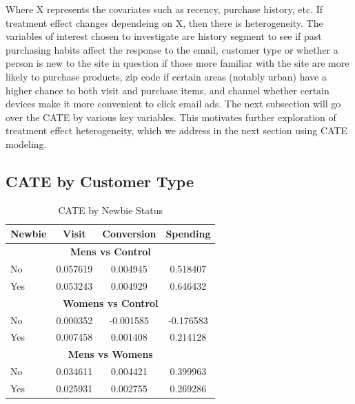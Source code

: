 \documentclass[10pt]{article}
\begin{document}
Where X represents the covariates such as recency, purchase history, etc. If treatment effect changes dependeing on X, then there is heterogeneity. The variables of interest chosen to investigate are history segment to see if past purchasing habits affect the response to the email, customer type or whether a person is new to the site in question if those more familiar with the site are more likely to purchase products, zip code if certain areas (notably urban) have a higher chance to both visit and purchase items, and channel whether certain devices make it more convenient to click email ads. The next subsection will go over the CATE by various key variables. This motivates further exploration of treatment effect heterogeneity, which we address in the next section using CATE modeling.


\subsection{CATE by Customer Type}

\begin{table}[H]
\centering
\caption{CATE by Newbie Status}
\begin{tabular}{lccc}
\toprule
\textbf{Newbie} & \textbf{Visit} & \textbf{Conversion} & \textbf{Spending} \\
\midrule
\multicolumn{4}{c}{\textbf{Mens vs Control}} \\
\midrule
No  & 0.057619 & 0.004945 & 0.518407 \\
Yes & 0.053243 & 0.004929 & 0.646432 \\
\midrule
\multicolumn{4}{c}{\textbf{Womens vs Control}} \\
\midrule
No  & 0.000352 & -0.001585 & -0.176583 \\
Yes & 0.007458 & 0.001408  & 0.214128 \\
\midrule
\multicolumn{4}{c}{\textbf{Mens vs Womens}} \\
\midrule
No  & 0.034611 & 0.004421 & 0.399963 \\
Yes & 0.025931 & 0.002755 & 0.269286 \\
\bottomrule
\end{tabular}
\end{table}
\end{document}
